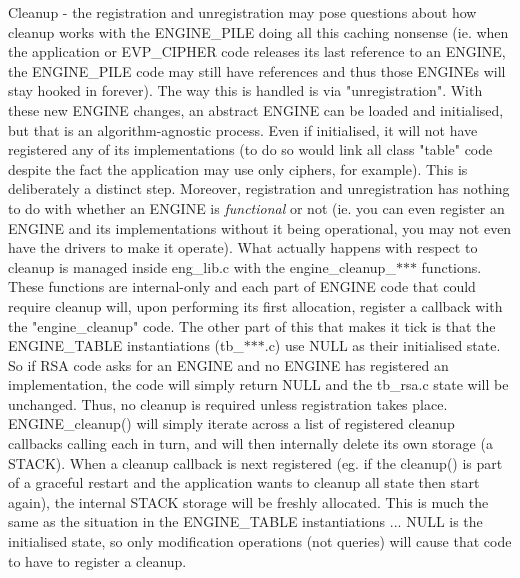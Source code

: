 Cleanup -\/ the registration and unregistration may pose questions about how cleanup works with the ENGINE\+\_\+\+PILE doing all this caching nonsense (ie. when the application or EVP\+\_\+\+CIPHER code releases its last reference to an ENGINE, the ENGINE\+\_\+\+PILE code may still have references and thus those ENGINEs will stay hooked in forever). The way this is handled is via "{}unregistration"{}. With these new ENGINE changes, an abstract ENGINE can be loaded and initialised, but that is an algorithm-\/agnostic process. Even if initialised, it will not have registered any of its implementations (to do so would link all class "{}table"{} code despite the fact the application may use only ciphers, for example). This is deliberately a distinct step. Moreover, registration and unregistration has nothing to do with whether an ENGINE is {\itshape functional} or not (ie. you can even register an ENGINE and its implementations without it being operational, you may not even have the drivers to make it operate). What actually happens with respect to cleanup is managed inside eng\+\_\+lib.\+c with the {\ttfamily engine\+\_\+cleanup\+\_\+\texorpdfstring{$\ast$}{*}\texorpdfstring{$\ast$}{*}\texorpdfstring{$\ast$}{*}} functions. These functions are internal-\/only and each part of ENGINE code that could require cleanup will, upon performing its first allocation, register a callback with the "{}engine\+\_\+cleanup"{} code. The other part of this that makes it tick is that the ENGINE\+\_\+\+TABLE instantiations (tb\+\_\+\texorpdfstring{$\ast$}{*}\texorpdfstring{$\ast$}{*}\texorpdfstring{$\ast$}{*}.c) use NULL as their initialised state. So if RSA code asks for an ENGINE and no ENGINE has registered an implementation, the code will simply return NULL and the tb\+\_\+rsa.\+c state will be unchanged. Thus, no cleanup is required unless registration takes place. ENGINE\+\_\+cleanup() will simply iterate across a list of registered cleanup callbacks calling each in turn, and will then internally delete its own storage (a STACK). When a cleanup callback is next registered (eg. if the cleanup() is part of a graceful restart and the application wants to cleanup all state then start again), the internal STACK storage will be freshly allocated. This is much the same as the situation in the ENGINE\+\_\+\+TABLE instantiations ... NULL is the initialised state, so only modification operations (not queries) will cause that code to have to register a cleanup.

